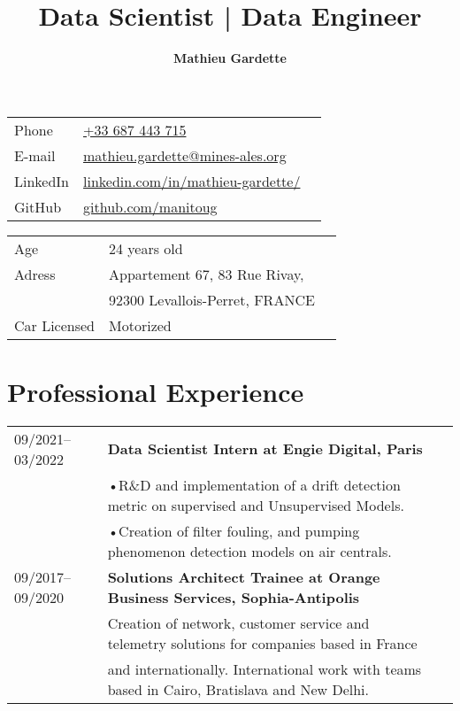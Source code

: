 \documentclass[9pt]{article}
\title{\bfseries\Huge Data Scientist | Data Engineer}
\author{\bfseries Mathieu Gardette}
\date{}
\begin{document}
    \maketitle
    \begin{minipage}[ht]{0.48\textwidth}
        \begin{tabular}{lll}
            Phone&\href{tel:+33687443715}{+33 687 443 715}\\
            E-mail&\href{mailto:mathieu.gardette@mines-ales.org}{mathieu.gardette@mines-ales.org}\\
            LinkedIn&\href{https://www.linkedin.com/in/mathieu-gardette/}{linkedin.com/in/mathieu-gardette/}\\
            GitHub& \href{https://github.com/manitoug}{github.com/manitoug}\\
        \end{tabular}
    \end{minipage}
    \begin{minipage}[ht]{0.48\textwidth}
        \begin{tabular}{lll}
            Age&24 years old\\
            Adress&Appartement 67, 83 Rue Rivay,\\
            &92300 Levallois-Perret, FRANCE\\
            Car Licensed& Motorized\\
        \end{tabular}
    \end{minipage}


    \section*{Professional Experience}
    \begin{tabular}{lll}
        09/2021--03/2022&{\bf Data Scientist Intern at Engie Digital, Paris}\\
        &•R\&D and implementation of a drift detection metric on supervised and Unsupervised Models.\\
        &•Creation of filter fouling, and pumping phenomenon detection models on air centrals.\\

        09/2017--09/2020&{\bf Solutions Architect Trainee at Orange Business Services, Sophia-Antipolis}\\
        &Creation of network, customer service and telemetry solutions for companies based in France \\
        &and internationally. International work with teams based in Cairo, Bratislava and New Delhi.\\
    \end{tabular}
\end{document}
